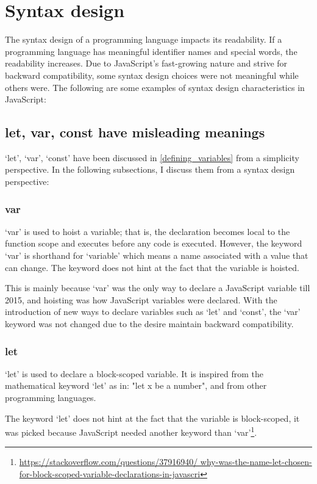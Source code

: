 \documentclass[11pt,a4paper]{article}
\begin{document}
\section{Syntax design}
The syntax design of a programming language impacts its readability.
If a programming language has meaningful identifier names and special words, the readability increases.
Due to JavaScript's fast-growing nature and strive for backward compatibility,
some syntax design choices were not meaningful while others were.
The following are some examples of syntax design characteristics in JavaScript:

\subsection{let, var, const have misleading meanings}
`let', `var', `const' have been discussed in \ref{defining_variables} from a simplicity perspective.
In the following subsections, I discuss them from a syntax design perspective:

\subsubsection{var}
`var' is used to hoist a variable;
that is, the declaration becomes local to the function scope and executes before any code is executed.
However, the keyword `var' is shorthand for `variable' which means a name associated with a value that can change.
The keyword does not hint at the fact that the variable is hoisted.

This is mainly because `var' was the only way to declare a JavaScript variable till 2015,
and hoisting was how JavaScript variables were declared.
With the introduction of new ways to declare variables such as `let' and `const',
the `var' keyword was not changed due to the desire maintain backward compatibility.

\subsubsection{let}
`let' is used to declare a block-scoped variable.
It is inspired from the mathematical keyword `let' as in: "let x be a number",
and from other programming languages.

The keyword `let' does not hint at the fact that the variable is block-scoped,
it was picked because JavaScript needed another keyword than
`var'\footnote{\raggedright \url{https://stackoverflow.com/questions/37916940/
        why-was-the-name-let-chosen-for-block-scoped-variable-declarations-in-javascri}}.
\end{document}
